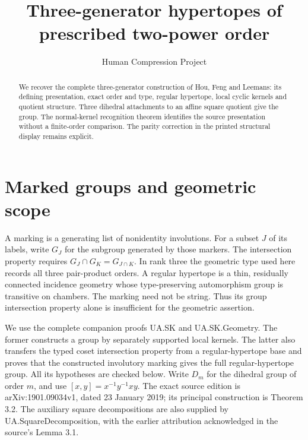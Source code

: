 
\title{Three-generator hypertopes of prescribed two-power order}
\author{Human Compression Project}
\date{}

\maketitle
\begin{abstract}
We recover the complete three-generator construction of Hou, Feng and
Leemans: its defining presentation, exact order and type, regular hypertope,
local cyclic kernels and quotient structure. Three dihedral attachments to an
affine square quotient give the group. The normal-kernel recognition theorem
identifies the source presentation without a finite-order comparison. The
parity correction in the printed structural display remains explicit.
\end{abstract}

\section{Marked groups and geometric scope}
A marking is a generating list of nonidentity involutions. For a subset $J$
of its labels, write $G_J$ for the subgroup generated by those markers. The
intersection property requires $G_J\cap G_K=G_{J\cap K}$. In rank three the
geometric type used here records all three pair-product orders.
A regular hypertope is a thin, residually connected incidence geometry whose
type-preserving automorphism group is transitive on chambers. The marking
need not be string. Thus its group intersection property alone is insufficient
for the geometric assertion.

We use the complete companion proofs UA.SK and UA.SK.Geometry. The former
constructs a group by separately supported local kernels. The latter also
transfers the typed coset intersection property from a regular-hypertope
base and proves that the constructed involutory marking gives the full
regular-hypertope group. All its hypotheses are checked below. Write $D_m$
for the dihedral group of order $m$, and use $[x,y]=x^{-1}y^{-1}xy$.
The exact source edition is arXiv:1901.09034v1, dated 23 January 2019;
its principal construction is Theorem 3.2. The auxiliary square decompositions
are also supplied by UA.SquareDecomposition, with the earlier attribution
acknowledged in the source's Lemma 3.1.

